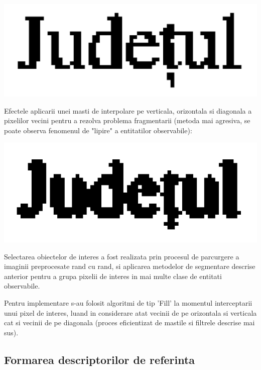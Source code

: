 \documentclass[10pt]{article}
\begin{document}
\begin{center}

  \includegraphics[scale=0.5]{lipire-normala}
  
\end{center}

\> Efectele aplicarii unei masti de interpolare pe verticala, orizontala si diagonala a pixelilor vecini pentru a rezolva problema fragmentarii
(metoda mai agresiva, se poate observa fenomenul de "lipire" a entitatilor observabile):

\begin{center}

  \includegraphics[scale=1]{lipire-agresiva}
  
\end{center}

\> Selectarea obiectelor de interes a fost realizata prin procesul de parcurgere a imaginii preprocesate rand cu rand,
si aplicarea metodelor de segmentare descrise anterior pentru a grupa pixelii de interes in mai multe clase de entitati observabile.

\> Pentru implementare s-au folosit algoritmi de tip 'Fill' la momentul interceptarii unui pixel de interes, luand in considerare atat
vecinii de pe orizontala si verticala cat si vecinii de pe diagonala (proces eficientizat de mastile si filtrele descrise mai sus).

\newpage

\subsection{Formarea descriptorilor de referinta}
\end{document}
